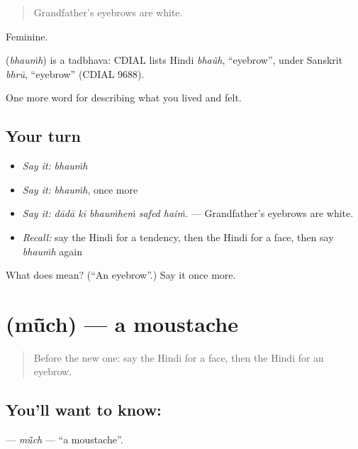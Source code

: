 \begin{quote}
Grandfather's eyebrows are white.
\end{quote}

Feminine.

\begin{cousinweb}
\textbf{} (\emph{bhauṁh}) is a tadbhava: CDIAL lists Hindi \emph{bhaũh}, \textquotedblleft{}eyebrow\textquotedblright{}, under Sanskrit \emph{bhrū}, \textquotedblleft{}eyebrow\textquotedblright{} (CDIAL 9688).
\end{cousinweb}

\begin{grammarlens}[title={What you've built}]
One more word for describing what you lived and felt.
\end{grammarlens}

\subsection*{Your turn}
\begin{itemize}
\raggedright
  \item \emph{Say it:} \emph{bhauṁh}
  \item \emph{Say it:} \emph{bhauṁh}, once more
  \item \emph{Say it:} \emph{dādā kī bhauṁheṁ safed haiṁ.} — Grandfather's eyebrows are white.
  \item \emph{Recall:} say the Hindi for a tendency, then the Hindi for a face, then say \emph{bhauṁh} again
\end{itemize}

\begin{tcolorbox}[breakable,colback=teal!4,colframe=teal!35!black,title={Before you move on}]
What does  mean? (\textquotedblleft{}An eyebrow\textquotedblright{}.) Say it once more.
\end{tcolorbox}
\section[\texorpdfstring{\hi{मूँछ} (mū̃ch)}{मूँछ (mū̃ch)}]{ (mū̃ch) — a moustache}

\label{lesson:HI-C476-much}



\begin{quote}
Before the new one: say the Hindi for a face, then the Hindi for an eyebrow.
\end{quote}

\subsection*{You'll want to know: }
\textbf{} — \emph{mū̃ch} — \textquotedblleft{}a moustache\textquotedblright{}.


